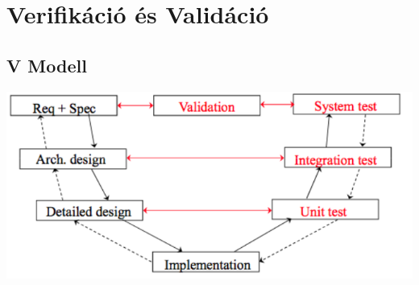 \section{Verifikáció és Validáció}

\subsection{V Modell}

	\begin{center}
		\includegraphics[scale=0.7]{img/vmodell}
	\end{center}

